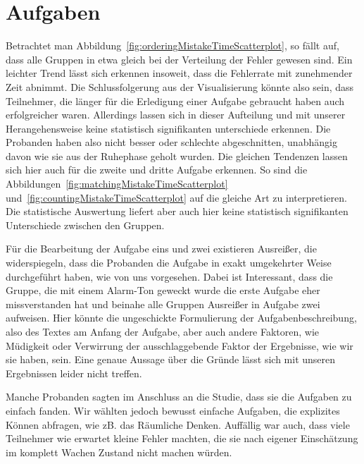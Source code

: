 \section{Aufgaben}

Betrachtet man Abbildung~\ref{fig:orderingMistakeTimeScatterplot}, so fällt auf, dass alle Gruppen in etwa gleich bei der Verteilung der Fehler gewesen sind. 
Ein leichter Trend lässt sich erkennen insoweit, dass die Fehlerrate mit zunehmender Zeit abnimmt. 
Die Schlussfolgerung aus der Visualisierung könnte also sein, dass Teilnehmer, die länger für die Erledigung einer Aufgabe gebraucht haben auch erfolgreicher waren. Allerdings lassen sich in dieser Aufteilung und mit unserer Herangehensweise keine statistisch signifikanten unterschiede erkennen. 
Die Probanden haben also nicht besser oder schlechte abgeschnitten, unabhängig davon wie sie aus der Ruhephase geholt wurden. 
Die gleichen Tendenzen lassen sich hier auch für die zweite und dritte Aufgabe erkennen. So sind die Abbildungen~\ref{fig:matchingMistakeTimeScatterplot} und~\ref{fig:countingMistakeTimeScatterplot} auf die gleiche Art zu interpretieren.
Die statistische Auswertung liefert aber auch hier keine statistisch signifikanten Unterschiede zwischen den Gruppen.

Für die Bearbeitung der Aufgabe eins und zwei existieren Ausreißer, die widerspiegeln, dass die Probanden die Aufgabe in exakt umgekehrter Weise durchgeführt haben, wie von uns vorgesehen. 
Dabei ist Interessant, dass die Gruppe, die mit einem Alarm-Ton geweckt wurde die erste Aufgabe eher missverstanden hat und beinahe alle Gruppen Ausreißer in Aufgabe zwei aufweisen.
Hier könnte die ungeschickte Formulierung der Aufgabenbeschreibung, also des Textes am Anfang der Aufgabe, aber auch andere Faktoren, wie Müdigkeit oder Verwirrung der ausschlaggebende Faktor der Ergebnisse, wie wir sie haben, sein. 
Eine genaue Aussage über die Gründe lässt sich mit unseren Ergebnissen leider nicht treffen.

Manche Probanden sagten im Anschluss an die Studie, dass sie die Aufgaben zu einfach fanden. 
Wir wählten jedoch bewusst einfache Aufgaben, die explizites Können abfragen, wie zB. das Räumliche Denken. 
Auffällig war auch, dass viele Teilnehmer wie erwartet kleine Fehler machten, die sie nach eigener Einschätzung im komplett Wachen Zustand nicht machen würden. 


